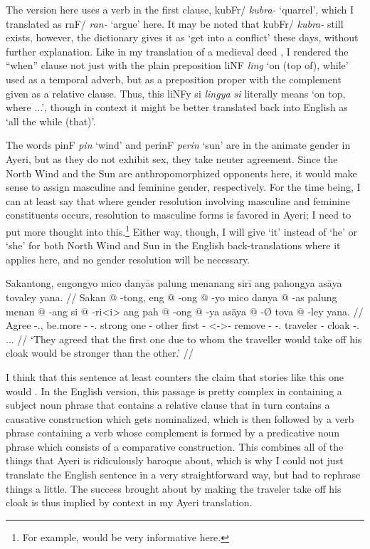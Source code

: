 \documentclass[12pt,paper=a4]{scrartcl}
\newcommand{\ayr}[1]{{\Tagati #1}}
\newcommand{\xayr}[3]{{\Tagati #1} \emph{#2} \enquote*{#3}}
\begin{document}
The \citeyear{becker2004} version here uses a verb in the first clause, \xayr{kubFr/}{kubra-}{quarrel}, which I translated as \xayr{rnF/}{ran-}{argue} here. It may be noted that \ayr{kubFr/} \textit{kubra-} still exists, however, the dictionary gives it as `get into a conflict' these days, without further explanation. Like in my translation of a medieval deed \autocite[9]{becker2015}, I rendered the \enquote{when} clause not just with the plain preposition \xayr{liNF}{ling}{on (top of), while} used as a temporal adverb, but as a preposition proper with the complement given as a relative clause. Thus, this \ayr{liNFy si} \textit{lingya si} literally means `on top, where ...', though in context it might be better translated back into English as `all the while (that)'.

The words \xayr{pinF}{pin}{wind} and \xayr{perinF}{perin}{sun} are in the animate gender in Ayeri, but as they do not exhibit sex, they take neuter agreement. Since the North Wind and the Sun are anthropomorphized opponents here, it would make sense to assign masculine and feminine gender, respectively. For the time being, I can at least say that where gender resolution involving masculine and feminine constituents occurs, resolution to masculine forms is favored in Ayeri; I need to put more thought into this.\footnote{For example, \cite[Ch. 8.3 and 8.4]{corbett2006} would be very informative here.} Either way, though, I will give `it' instead of `he' or `she' for both North Wind and Sun in the English back-translations where it applies here, and no gender resolution will be necessary.

\ex %
\begingl
	\glpreamble Sakantong, engongyo mico danyās palung menanang sirī ang pahongya asāya tovaley yana. //
	\gla Sakan @ -tong, eng @ -ong @ -yo mico danya @ -as palung menan @ -ang si @ -ri<i> ang pah @ -ong @ -ya asāya @ -Ø tova @ -ley yana. //
	\glb Agree -\Tpl{}.\N{}, be.more -\Irr{} -\Tsg{}.\N{} strong one -\Parg{} other first -\Aarg{} \Rel{} <-\Aarg{}>-\Ins{} \AgtT{} remove -\Irr{} -\Tsg{}.\M{} traveler -\Top{} cloak -\Parg{}.\Inan{} \Tsg{}.\M{}.\Gen{}. //
	\glft `They agreed that the first one due to whom the traveller would take off his cloak would be stronger than the other.' //
\endgl
\xe

I think that this sentence at least counters the claim that stories like this one would . In the English version, this passage is pretty complex in containing a subject noun phrase that contains a relative clause that in turn contains a causative construction which gets nominalized, which is then followed by a verb phrase containing a verb whose complement is formed by a predicative noun phrase which consists of a comparative construction. This combines all of the things that Ayeri is ridiculously baroque about, which is why I could not just translate the English sentence in a very straightforward way, but had to rephrase things a little. The success brought about by making the traveler take off his cloak is thus implied by context in my Ayeri translation.
\end{document}
